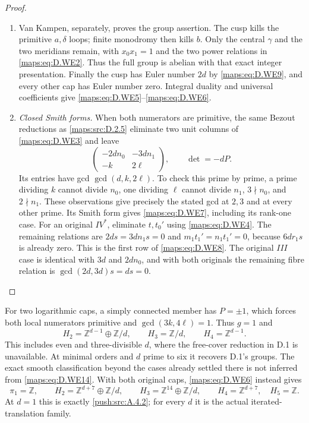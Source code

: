 \begin{proof}
\begin{enumerate}[label=\arabic*.,leftmargin=*]
\item Van Kampen, separately, proves the group assertion.
The cusp kills the primitive $a,\delta$ loops;
finite monodromy then kills $b$. Only the central
$\gamma$ and the two meridians remain, with
$x_0x_1=1$ and the two power relations in \eqref{maps:eq:D.WE2}.
Thus the full group is abelian with that exact
integer presentation. Finally the cusp has Euler
number $2d$ by \eqref{maps:eq:D.WE9}, and every other cap has
Euler number zero. Integral duality and universal
coefficients give \eqref{maps:eq:D.WE5}--\eqref{maps:eq:D.WE6}.

\item \emph{Closed Smith forms.}
When both numerators are primitive, the same
Bezout reductions as \ref{maps:src:D.2.5} eliminate two unit
columns of \eqref{maps:eq:D.WE3} and leave
\[
 \begin{pmatrix}
 -2dn_0&-3dn_1\\-k&2\ell
 \end{pmatrix},\qquad \det=-dP .
\]
Its entries have gcd $\gcd(d,k,2\ell)$.
To check this prime by prime, a prime dividing
$k$ cannot divide $n_0$, one dividing $\ell$
cannot divide $n_1$, $3\nmid n_0$, and $2\nmid n_1$.
These observations give precisely the stated gcd
at $2,3$ and at every other prime. Its Smith
form gives \eqref{maps:eq:D.WE7}, including its rank-one case.
For an original $IV^*$, eliminate $t,t_0'$ using
\eqref{maps:eq:D.WE4}. The remaining relations are
$2ds=3dn_1s=0$ and
$m_1t_1'=n_1t_1'=0$, because $6dr_1s$ is already
zero. This is the first row of \eqref{maps:eq:D.WE8}.
The original $III$ case is identical with
$3d$ and $2dn_0$, and with both originals the
remaining fibre relation is $\gcd(2d,3d)s=ds=0$.
\end{enumerate}
\end{proof}

For two logarithmic caps, a simply connected member
has $P=\pm1$, which forces both local numerators
primitive and $\gcd(3k,4\ell)=1$. Thus $g=1$ and
\[
 H_2=\mathbb Z^{d-1}\oplus\mathbb Z/d,\qquad
 H_3=\mathbb Z/d,\qquad H_4=\mathbb Z^{d-1}.                \tag{D.WE14}\label{maps:eq:D.WE14}
\]
This includes even and three-divisible $d$, where the
free-cover reduction in D.1 is unavailable. At minimal
orders and $d$ prime to six it recovers D.1's groups.
The exact smooth classification beyond the cases
already settled there is not inferred from \eqref{maps:eq:D.WE14}.
With both original caps, \eqref{maps:eq:D.WE6} instead gives
\[
 \pi_1=\mathbb Z,\qquad
 H_2=\mathbb Z^{d+7}\oplus\mathbb Z/d,\qquad
 H_3=\mathbb Z^{14}\oplus\mathbb Z/d,\qquad
 H_4=\mathbb Z^{d+7},\quad H_5=\mathbb Z.
\]
At $d=1$ this is exactly \cref{push:src:A.4.2}; for every $d$ it is the
actual iterated-translation family.


